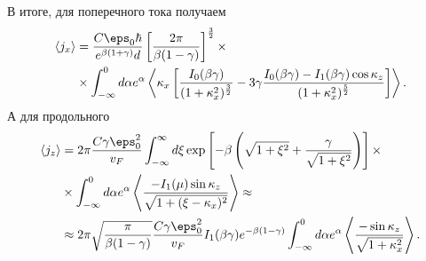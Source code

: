 В итоге, для поперечного тока получаем
\begin{align*}
    \langle j_x \rangle &=
    \frac{C\eps_0\hbar}{e^{\beta(1+\gamma)}d}\left[\frac{2\pi}{\beta(1-\gamma)}\right]^\frac{3}{2}\times \\
  &\times\int_{-\infty}^{0} d \alpha e^{\alpha} \left\langle
    \kappa_x\left[\frac{I_0(\beta\gamma)}{(1+\kappa_x^2)^\frac{3}{2}}-3\gamma
    \frac{I_0(\beta\gamma)-I_1(\beta\gamma)\cos\kappa_z}{(1 +
    \kappa_x^2)^\frac{5}{2}}\right]\right\rangle.
\end{align*}
А для продольного
\begin{align*}
  \langle j_z \rangle &= 2\pi \frac{C\gamma\eps_0^2}{v_F} \int_{-\infty}^\infty d\xi \exp\left[-\beta\left(\sqrt{1+\xi^2} + \frac{\gamma}{\sqrt{1+\xi^2}}\right)\right]\times\\&\times
    \int_{-\infty}^{0}d \alpha e^\alpha\left\langle
    \frac{-I_1(\mu)\sin\kappa_z}{\sqrt{1+(\xi-\kappa_x)^2}}\right\rangle \approx
    \\ &\approx
    2\pi\sqrt{\frac{\pi}{\beta(1-\gamma)}} \frac{C\gamma\eps_0^2}{v_F}
    I_1(\beta\gamma)e^{-\beta(1-\gamma)}
    \int_{-\infty}^{0}d \alpha e^\alpha\left\langle
    \frac{-\sin\kappa_z}{\sqrt{1+\kappa_x^2}}\right\rangle.
\end{align*}

